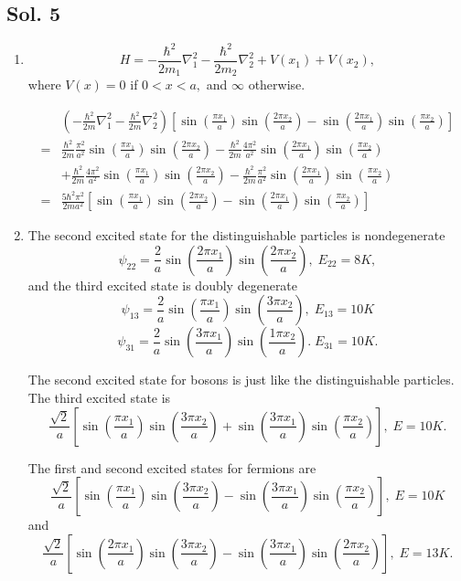 \subsection*{Sol. 5}
\begin{enumerate}
    \item 
    $$
    H = -\frac{\hbar^2}{2m_1}\nabla_1^2
    -\frac{\hbar^2}{2m_2}\nabla_2^2
    +V(x_1)+V(x_2),
    $$
    where $V(x)=0$ if $0<x<a,$ and $\infty$ otherwise.

    \begin{align*}
        &(-\frac{\hbar^2}{2m}\nabla_1^2
    -\frac{\hbar^2}{2m}\nabla_2^2)
        \left[
        \sin(\frac{\pi x_1}{a})
        \sin(\frac{2\pi x_2}{a})
        -
        \sin(\frac{2\pi x_1}{a})
        \sin(\frac{\pi x_2}{a})
        \right]\\
        =&
        \frac{\hbar^2}{2m}
        \frac{\pi^2}{a^2}\sin(\frac{\pi x_1}{a})
        \sin(\frac{2\pi x_2}{a})
        -
        \frac{\hbar^2}{2m}
        \frac{4\pi^2}{a^2}
        \sin(\frac{2\pi x_1}{a})
        \sin(\frac{\pi x_2}{a})\\
        &+\frac{\hbar^2}{2m}
        \frac{4\pi^2}{a^2}\sin(\frac{\pi x_1}{a})
        \sin(\frac{2\pi x_2}{a})
        -\frac{\hbar^2}{2m}
        \frac{\pi^2}{a^2}
        \sin(\frac{2\pi x_1}{a})
        \sin(\frac{\pi x_2}{a})\\
        =&
        \frac{5\hbar^2\pi^2}{2ma^2}
        \left[
        \sin(\frac{\pi x_1}{a})
        \sin(\frac{2\pi x_2}{a})
        -
        \sin(\frac{2\pi x_1}{a})
        \sin(\frac{\pi x_2}{a})
        \right]
    \end{align*}
    \item 
    The second excited state for the distinguishable particles is nondegenerate
    $$
    \psi_{22}=
    \frac{2}{a}\sin(\frac{2\pi x_1}{a})
    \sin(\frac{2\pi x_2}{a}),\; 
    E_{22}=8K,
    $$
    and the third excited state is doubly degenerate
    $$
    \psi_{13}=
    \frac{2}{a}\sin(\frac{\pi x_1}{a})
    \sin(\frac{3\pi x_2}{a}),\; 
    E_{13}=10K
    $$
    $$
    \psi_{31}=
    \frac{2}{a}\sin(\frac{3\pi x_1}{a})
    \sin(\frac{1\pi x_2}{a}).\; 
    E_{31}=10K.
    $$
    
    The second excited state for bosons is just like the distinguishable particles. The third excited state is 
    $$
    \frac{\sqrt{2}}{a}
    \left[
    \sin(\frac{\pi x_1}{a})
    \sin(\frac{3\pi x_2}{a})+
    \sin(\frac{3\pi x_1}{a})
    \sin(\frac{\pi x_2}{a})
    \right], \; 
    E = 10K.
    $$
    
    The first and second excited states for fermions are 
    $$
    \frac{\sqrt{2}}{a}
    \left[
    \sin(\frac{\pi x_1}{a})
    \sin(\frac{3\pi x_2}{a})-
    \sin(\frac{3\pi x_1}{a})
    \sin(\frac{\pi x_2}{a})
    \right],\;
    E = 10K
    $$
    and
    $$
    \frac{\sqrt{2}}{a}
    \left[
    \sin(\frac{2\pi x_1}{a})
    \sin(\frac{3\pi x_2}{a})-
    \sin(\frac{3\pi x_1}{a})
    \sin(\frac{2\pi x_2}{a})
    \right]
    , \; 
    E = 13K.
    $$
\end{enumerate}
